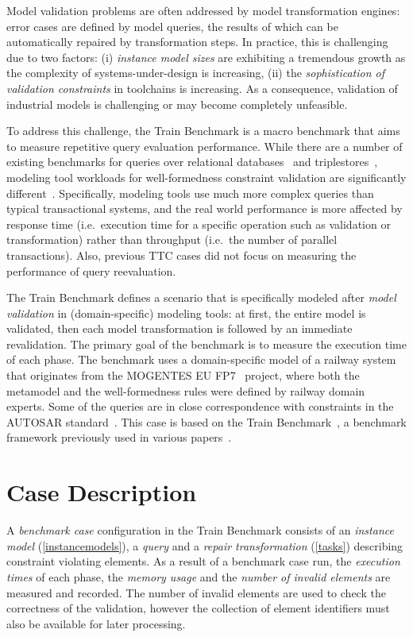 \documentclass[submission,copyright,creativecommons]{eptcs}
\newcommand{\tb}{Train Benchmark\xspace}
\begin{document}
Model validation problems are often addressed by model transformation engines: error cases are defined by model queries, the results of which can be automatically repaired by transformation steps. In practice, this is challenging due to two factors: (i) \emph{instance model sizes} are exhibiting a tremendous growth as the complexity of systems-under-design is increasing, (ii) the \emph{sophistication of validation constraints} in toolchains is increasing. As a consequence, validation of industrial models is challenging or may become completely unfeasible.

To address this challenge, the \tb is a macro benchmark that aims to measure repetitive query evaluation performance. While there are a number of existing benchmarks for queries over relational databases~\cite{TPC-C, Wisconsin} and triplestores~\cite{BSBM, SP2Bench, DBpedia, LUBM}, modeling tool workloads for well-formedness constraint validation are significantly different~\cite{ase2013}. Specifically, modeling tools use much more complex queries than typical transactional systems, and the real world performance is more affected by response time (i.e.\ execution time for a specific operation such as validation or transformation) rather than throughput (i.e.\ the number of parallel transactions). Also, previous TTC cases did not focus on measuring the performance of query reevaluation.

The \tb defines a scenario that is specifically modeled after \emph{model validation} in (domain-specific) modeling tools: at first, the entire model is validated, then each model transformation is followed by an immediate revalidation. The primary goal of the benchmark is to measure the execution time of each phase. The benchmark uses a domain-specific model of a railway system that originates from the \mbox{MOGENTES} EU FP7~\cite{MOGENTES} project, where both the metamodel and the well-formedness rules were defined by railway domain experts. Some of the queries are in close correspondence with constraints in the AUTOSAR standard~\cite{AUTOSAR}. This case is based on the \tb~\cite{TrainBenchmarkTechReport}, a benchmark framework previously used in various papers~\cite{bigmde2013, ase2013, bigmde2014, models2014, scp2015}.

\section{Case Description}

A \emph{benchmark case} configuration in the \tb consists of an \emph{instance model} (\autoref{instancemodels}), a \emph{query} and a \emph{repair transformation} (\autoref{tasks}) describing constraint violating elements. As a result of a benchmark case run, the \emph{execution times} of each phase, the \emph{memory usage} and the \emph{number of invalid elements} are measured and recorded. The number of invalid elements are used to check the correctness of the validation, however the collection of element identifiers must also be available for later processing.
\end{document}
